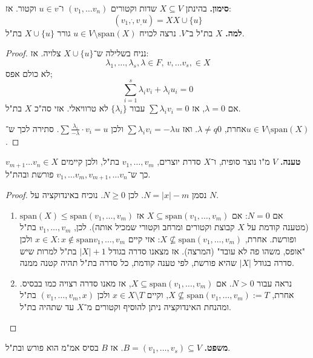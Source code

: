 \documentclass[]{article}
\begin{document}
	\textbf{סימון. }בהינתן $X \subseteq V$ שדות וקטורים $(v_1, \dots v_n)$ ו־$u \in v$ וקטור. אז: 
	\[ (v_1, \dot , v_, u) = X X \cup \{u\} \]
	\textbf{למה. }$X$ בת"ל ב־$V$. נרצה לכויח $u \in V \setminus \mathrm{span}(X)$ גורר $X \cup\{u\}$ בת"ל. 
	\begin{proof}
		נניח בשלילה ש־$X \cup \{u\}$ צלויה. אז: 
		\[ \lambda_1, \dots, \lambda_s, \lambda \in F, \ v, \dots v_s, \in X \]
		לא כולם אפס;
		\[ \sum_{i = 1}^{s}\lambda_iv_i + \lambda_iu_i = 0 \]
	אם $\lambda = 0$, אז $\sum \lambda_iv_i = 0$ עבור $\{\lambda_i\}$ לא טרוויאלי. אזי סה"כ $X$ בת"ל. 
	
	אחרת, $\lambda \ne q0$. ואז $\sum \lambda_iv_i = -\lambda u$ ולכן $\sum \frac{\lambda_i}{-\lambda} \cdot v_i = u$. סתירה לכך ש־$u \in V \setminus \mathrm{span}(X)$. 
	\end{proof}
	
	\textbf{טענה. }$V$ מ"ו נוצר סופית, ו־$X$ סדרת יוצרים, $v_1, \dots, v_m$ בת"ל, ולכן קיימים $v_{m + 1} \dots v_n \in X$ כך ש־$v_1, \dots v_m, v_{m + 1}, \dots v_n$ פורשת ובהת"ל. 
	
	\begin{proof}
		נסמן $N = |x| - m$. לכן $N \ge 0$. נוכיח באינדוקציה על $N$. 
		\begin{enumerate}
			\item אם $N = 0$: אם $X \subseteq \mathrm{span}(v_1, \dots, v_m)$ אז $\mathrm{span}(X) \le \mathrm{span}(v_1, \dots, v_m)$ (מטענה קודמת על $X$ קבוצת וקטורים ומרחב וקטורי שמכיל אותה). לכן, $v_1, \dots, v_m$ בת"ל ופורשת. 
			 אחרת, $X \nsubseteq \mathrm{span}(v_1, \dots, v_m)$: אזי קיים $x \in X \colon x \notin \mathrm{span}v_1, \dots, v_m$ ולכן "אופס, משהו פה לא עובד" (המרצה). אז מצאנו סדרה בגודל $|X| + 1$ בת"ל למרות שיש סדרה בגודל $|X|$ שהיא פורשת, לפי טענה קודמת, כל סדרה בת"ל תהיה קטנה ממנה. 
			 
			 \item נראה עבור $N > 0$. אם $X \subseteq \mathrm{span}(v_1, \dots, v_m)$, אז מאנו סדרה רצויה כמו בבסיס. 
			 אחרת, $X \nsubseteq \mathrm{span}(v_1, \dots, v_m) := T$, וקיים $x \in X \setminus T$ ולכן $(v_1, \dots, v_m, x)$ בת"ל ומהנחת האינדוקציה ניתן להוסיף וקטורים מ־$X$ עד שתהיה בת"ל. 
		\end{enumerate}
	\end{proof}
	
	\textbf{משפט. }$B = (v_1, \dots, v_s) \subseteq V$. אז $B$ בסיס אמ"מ הוא פורש ובת"ל. 
	
\end{document}
